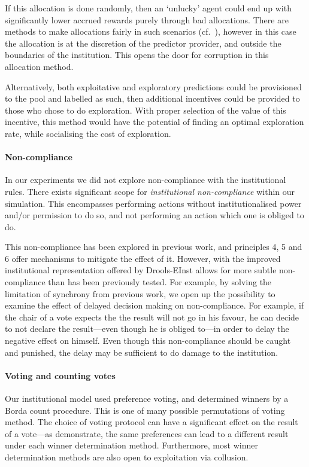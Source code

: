 If this allocation is done randomly, then an `unlucky' agent could end up with
significantly lower accrued rewards purely through bad allocations. There are methods
to make allocations fairly in such scenarios (cf.~\citet{Pitt2014}), however
in this case the allocation is at the discretion of the predictor provider,
and outside the boundaries of the institution. This opens the door for
corruption in this allocation method.

Alternatively, both exploitative and exploratory predictions could be
provisioned to the pool and labelled as such, then additional incentives could
be provided to those who chose to do exploration. With proper selection of the
value of this incentive, this method would have the potential of finding an
optimal exploration rate, while socialising the cost of exploration.

\paragraph{Non-compliance} 
In our experiments we did not explore non-compliance with the institutional rules.
There exists significant scope for \emph{institutional non-compliance} within our
simulation. This encompasses performing actions without institutionalised
power and/or permission to do so, and not performing an action which one is
obliged to do.

This non-compliance has been explored in previous work, and principles
4, 5 and 6 offer mechanisms to mitigate the effect of it. However, with the
improved institutional representation offered by Drools-EInst allows for more
subtle non-compliance than has been previously tested. For example, by solving
the limitation of synchrony from previous work, we open up the possibility to
examine the effect of delayed decision making on non-compliance. For example,
if the chair of a vote expects the the result will not go in his favour, he
can decide to not declare the result---even though he is obliged to---in order to delay
the negative effect on himself. Even though this non-compliance should be
caught and punished, the delay may be sufficient to do damage to the
institution.

\paragraph{Voting and counting votes} Our institutional model used preference
voting, and determined winners by a Borda count procedure. This is one of many
possible permutations of voting method. The choice of voting protocol can have
a significant effect on the result of a vote---as \citet{Pitt2011b}
demonstrate, the same preferences can lead to a different result under each
winner determination method. Furthermore, most winner determination methods
are also open to exploitation via collusion.

